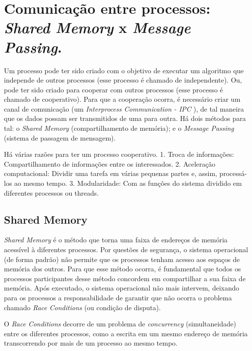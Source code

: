\hypertarget{comunicauxe7uxe3o-entre-processos-shared-memory-x-message-passing.}{%
\section{\texorpdfstring{Comunicação entre processos: \emph{Shared
Memory} x \emph{Message
Passing}.}{Comunicação entre processos: Shared Memory x Message Passing.}}\label{comunicauxe7uxe3o-entre-processos-shared-memory-x-message-passing.}}

Um processo pode ter sido criado com o objetivo de executar um algoritmo
que independe de outros processos (esse processo é chamado de
independente). Ou, pode ter sido criado para cooperar com outros
processos (esse processo é chamado de cooperativo). Para que a
cooperação ocorra, é necessário criar um canal de comunicação (um
\emph{Interprocess Communication - IPC} ), de tal maneira que os dados
possam ser transmitidos de uma para outra. Há dois métodos para tal: o
\emph{Shared Memory} (compartilhamento de memória); e o \emph{Message
Passing} (sistema de passagem de mensagem).

Há várias razões para ter um processo cooperativo. 1. Troca de
informações: Compartilhamento de informações entre os interessados. 2.
Aceleração computacional: Dividir uma tarefa em várias pequenas partes
e, assim, processá-los ao mesmo tempo. 3. Modularidade: Com as funções
do sistema dividido em diferentes processos ou threads.

\hypertarget{shared-memory}{%
\subsection{Shared Memory}\label{shared-memory}}

\emph{Shared Memory} é o método que torna uma faixa de endereços de
memória acessível à diferentes processos. Por questões de segurança, o
sistema operacional (de forma padrão) não permite que os processos
tenham acesso aos espaços de memória dos outros. Para que esse método
ocorra, é fundamental que todos os processos participantes desse método
concordem em compartilhar a sua faixa de memória. Após executado, o
sistema operacional não mais intervem, deixando para os processos a
responsabilidade de garantir que não ocorra o problema chamado
\emph{Race Conditions} (ou condição de disputa).

O \emph{Race Conditions} decorre de um problema de \emph{concurrency}
(simultaneidade) entre os diferentes processos, como a escrita em um
mesmo endereço de memória transcorrendo por mais de um processo ao mesmo
tempo.

